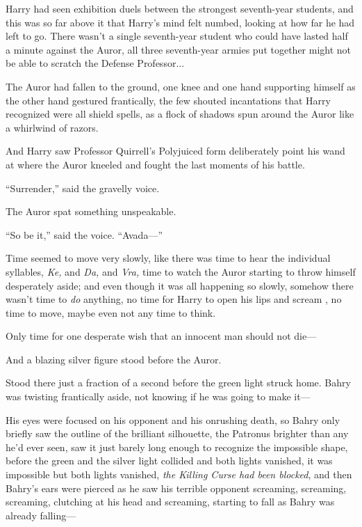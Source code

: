 Harry had seen exhibition duels between the strongest seventh-year students, and this was so far above it that Harry’s mind felt numbed, looking at how far he had left to go. There wasn’t a single seventh-year student who could have lasted half a minute against the Auror, all three seventh-year armies put together might not be able to scratch the Defense Professor...

The Auror had fallen to the ground, one knee and one hand supporting himself as the other hand gestured frantically, the few shouted incantations that Harry recognized were all shield spells, as a flock of shadows spun around the Auror like a whirlwind of razors.

And Harry saw Professor Quirrell’s Polyjuiced form deliberately point his wand at where the Auror kneeled and fought the last moments of his battle.

“Surrender,” said the gravelly voice.

The Auror spat something unspeakable.

“So be it,” said the voice. “Avada—”

Time seemed to move very slowly, like there was time to hear the individual syllables, \emph{Ke,} and \emph{Da,} and \emph{Vra,} time to watch the Auror starting to throw himself desperately aside; and even though it was all happening so slowly, somehow there wasn’t time to \emph{do} anything, no time for Harry to open his lips and scream , no time to move, maybe even not any time to think.

Only time for one desperate wish that an innocent man should not die—

And a blazing silver figure stood before the Auror.

Stood there just a fraction of a second before the green light struck home.
\sbreak
Bahry was twisting frantically aside, not knowing if he was going to make it—

His eyes were focused on his opponent and his onrushing death, so Bahry only briefly saw the outline of the brilliant silhouette, the Patronus brighter than any he’d ever seen, saw it just barely long enough to recognize the impossible shape, before the green and the silver light collided and both lights vanished, it was impossible but both lights vanished, \emph{the Killing Curse had been blocked}, and then Bahry’s ears were pierced as he saw his terrible opponent screaming, screaming, screaming, clutching at his head and screaming, starting to fall as Bahry was already falling—

